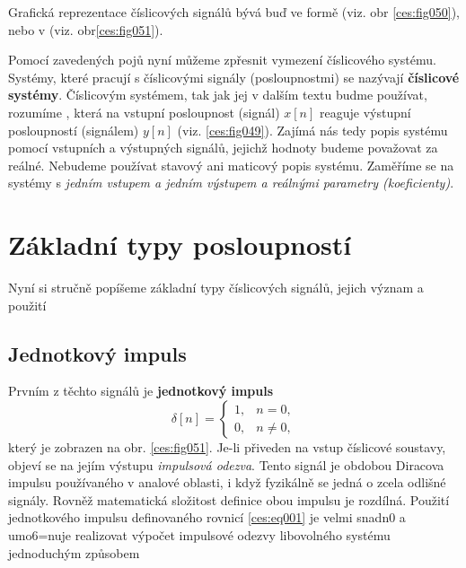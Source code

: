     Grafická reprezentace číslicových signálů bývá buď ve  formě (viz. obr
    \ref{ces:fig050}), nebo v  (viz. obr\ref{ces:fig051}).

  

    Pomocí zavedených pojů nyní můžeme zpřesnit vymezení číslicového systému. Systémy, které pracují
    s číslicovými signály (posloupnostmi) se nazývají \textbf{číslicové systémy}. Číslicovým
    systémem, tak jak jej v dalším textu budme používat, rozumíme , která na
    vstupní posloupnost (signál) \(x[n]\) reaguje výstupní posloupností (signálem) \(y[n]\) (viz.
    \ref{ces:fig049}). Zajímá nás tedy popis systému pomocí vstupních a výstupných signálů, jejichž
    hodnoty budeme považovat za reálné. Nebudeme používat stavový ani maticový popis systému.
    Zaměříme se na systémy s \emph{jedním vstupem a jedním výstupem a reálnými parametry
    (koeficienty)}.
    

  \section{Základní typy posloupností}\label{ces:IchapIsecII}
    Nyní si stručně popíšeme základní typy číslicových signálů, jejich význam a použití

    \subsection{Jednotkový impuls}
      Prvním z těchto signálů je \textbf{jednotkový impuls}
      \begin{equation}\label{ces:eq001}
        \delta[n]=
        \begin{cases} 
            1, &  n = 0, \\
             0, &  n \neq 0,
        \end{cases}
      \end{equation}
      který je zobrazen na obr. \ref{ces:fig051}. Je-li přiveden na vstup číslicové soustavy,
      objeví se na jejím výstupu \emph{impulsová odezva}. Tento signál je obdobou Diracova
      impulsu používaného v analové oblasti, i když fyzikálně se jedná o zcela odlišné
      signály. Rovněž matematická složitost definice obou impulsu je rozdílná. Použití
      jednotkového impulsu definovaného rovnicí \ref{ces:eq001} je velmi snadn0 a umo6=nuje
      realizovat výpočet impulsové odezvy libovolného systému jednoduchým způsobem
            
